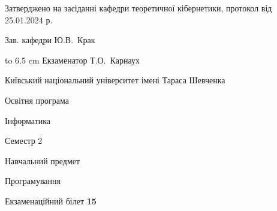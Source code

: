 \documentclass[12pt, ukrainian]{article}
\begin{document}
{\smallskip\smallskip \begin {scriptsize} Затверджено на засіданні кафедри теоретичної кібернетики, протокол   від   25.01.2024 р.\par\smallskip\smallskip\smallskip\smallskip
{\parbox {6.5 cm} {Зав. кафедри \dotfill Ю.В.~Крак}}\hspace {0.7cm} {\hbox to 6.5 cm { Екзаменатор \dotfill Т.О.~Карнаух}} \end{scriptsize}}
\newpage
{{\begin {scriptsize}\par
{ \center  Київський національний університет імені Тараса Шевченка \par}
{\parbox {5 cm}{Освітня програма \hfill}{\parbox {7 cm}{Інформатика\hfill}}\parbox {6 cm}{\hfill Семестр 2}}\par
{\parbox {5 cm} {Навчальний предмет \hfill}\parbox {7 cm}{Програмування \hfill}\parbox {6cm}{\hfill}\par}\vspace{-15pt} \end{scriptsize}}{\center Екзаменаційний білет \No \textbf { 15 }\par}}
\end{document}
